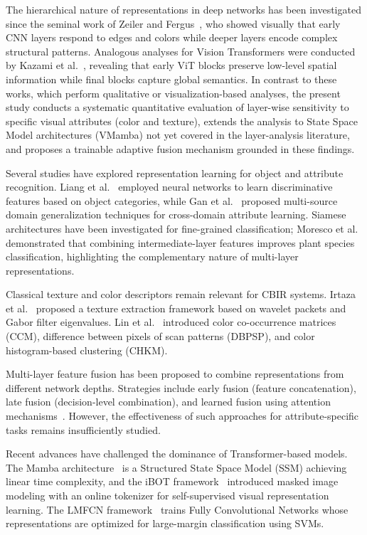 \documentclass[conference]{IEEEtran}
\begin{document}
The hierarchical nature of representations in deep networks has been
investigated since the seminal work of Zeiler and
Fergus~\cite{bzeiler}, who showed visually that early CNN layers respond
to edges and colors while deeper layers encode complex structural patterns.
Analogous analyses for Vision Transformers were conducted by
Kazami et al.~\cite{bkazami}, revealing that early ViT blocks preserve
low-level spatial information while final blocks capture global semantics.
In contrast to these works, which perform qualitative or visualization-based
analyses, the present study conducts a systematic quantitative evaluation
of layer-wise sensitivity to specific visual attributes (color and
texture), extends the analysis to State Space Model architectures (VMamba)
not yet covered in the layer-analysis literature, and proposes a trainable
adaptive fusion mechanism grounded in these findings.

Several studies have explored representation learning for object and
attribute recognition.
Liang et al.~\cite{b10} employed neural networks to learn discriminative
features based on object categories, while Gan et al.~\cite{b11} proposed
multi-source domain generalization techniques for cross-domain attribute
learning.
Siamese architectures have been investigated for fine-grained
classification; Moresco et al.~\cite{b8} demonstrated that combining
intermediate-layer features improves plant species classification,
highlighting the complementary nature of multi-layer representations.

Classical texture and color descriptors remain relevant for CBIR systems.
Irtaza et al.~\cite{b13} proposed a texture extraction framework based on
wavelet packets and Gabor filter eigenvalues.
Lin et al.~\cite{b15} introduced color co-occurrence matrices (CCM),
difference between pixels of scan patterns (DBPSP), and color
histogram-based clustering (CHKM).

Multi-layer feature fusion has been proposed to combine representations
from different network depths.
Strategies include early fusion (feature concatenation), late fusion
(decision-level combination), and learned fusion using attention
mechanisms~\cite{b26,b27}.
However, the effectiveness of such approaches for attribute-specific tasks
remains insufficiently studied.

Recent advances have challenged the dominance of Transformer-based models.
The Mamba architecture~\cite{b16} is a Structured State Space Model (SSM)
achieving linear time complexity, and the iBOT
framework~\cite{b17} introduced masked image modeling with an online
tokenizer for self-supervised visual representation learning.
The LMFCN framework~\cite{b28} trains Fully Convolutional Networks whose
representations are optimized for large-margin classification using SVMs.
\end{document}
